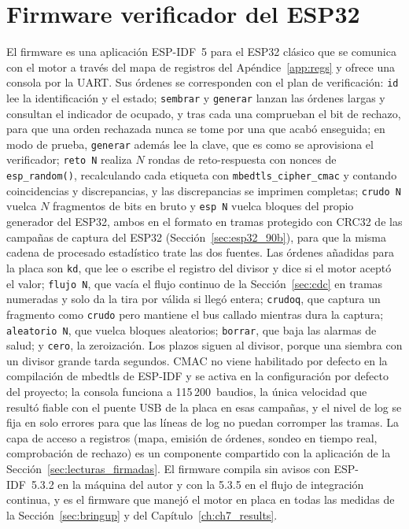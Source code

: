 \section{Firmware verificador del ESP32}
\label{sec:firmware}

El firmware es una aplicación ESP-IDF~5 para el ESP32 clásico que se
comunica con el motor a través del mapa de registros del
Apéndice~\ref{app:regs} y ofrece una consola por la UART. Sus órdenes se
corresponden con el plan de verificación: \texttt{id} lee la
identificación y el estado; \texttt{sembrar} y \texttt{generar} lanzan
las órdenes largas y consultan el indicador de ocupado, y tras cada una
comprueban el bit de rechazo, para que una orden rechazada nunca se tome
por una que acabó enseguida; en modo de prueba, \texttt{generar} además
lee la clave, que es como se aprovisiona el verificador; \texttt{reto N}
realiza $N$ rondas de reto-respuesta con
nonces de \texttt{esp\_random()}, recalculando cada etiqueta con
\texttt{mbedtls\_cipher\_cmac} y contando coincidencias y discrepancias,
y las discrepancias se imprimen completas; \texttt{crudo N} vuelca $N$
fragmentos de bits en bruto y \texttt{esp N} vuelca bloques del propio
generador del ESP32, ambos en el formato en tramas protegido con CRC32
de las campañas de captura del ESP32 (Sección~\ref{sec:esp32_90b}), para
que la misma cadena de
procesado estadístico trate las dos fuentes. Las órdenes añadidas para
la placa son \texttt{kd}, que lee o escribe el registro del divisor y
dice si el motor aceptó el valor; \texttt{flujo N}, que vacía el flujo
continuo de la Sección~\ref{sec:cdc} en tramas numeradas y solo da la
tira por válida si llegó entera; \texttt{crudoq}, que captura un
fragmento como \texttt{crudo} pero mantiene el bus callado mientras dura
la captura; \texttt{aleatorio N}, que vuelca bloques aleatorios;
\texttt{borrar}, que baja las alarmas de salud; y \texttt{cero}, la
zeroización. Los plazos siguen al divisor, porque una siembra con un
divisor grande tarda segundos. CMAC no viene habilitado
por defecto en la compilación de mbedtls de ESP-IDF y se activa en la
configuración por defecto del proyecto; la consola funciona a
115\,200~baudios, la única velocidad que resultó fiable con el puente
USB de la placa en esas campañas, y el nivel de log se fija en
solo errores para que las líneas de log no puedan corromper las tramas.
La capa de acceso a registros (mapa, emisión de órdenes, sondeo en
tiempo real, comprobación de rechazo) es un componente compartido con la
aplicación de la Sección~\ref{sec:lecturas_firmadas}. El firmware
compila sin avisos con ESP-IDF~5.3.2 en la máquina del autor y con la
5.3.5 en el flujo de integración continua, y es el firmware que manejó
el motor en placa en todas las medidas de la Sección~\ref{sec:bringup} y
del Capítulo~\ref{ch:ch7_results}.

